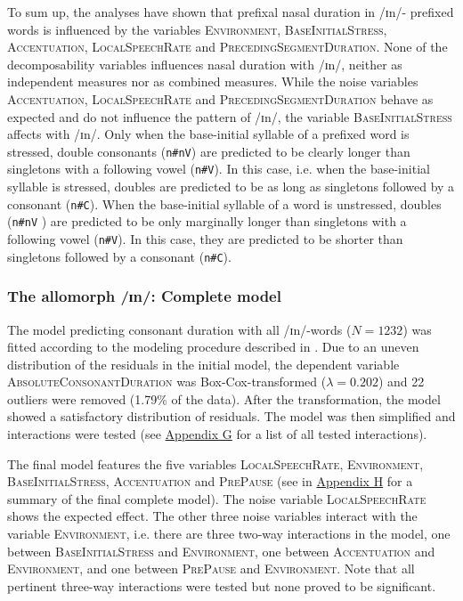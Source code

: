 To sum up, the analyses have shown that prefixal nasal duration in /ɪn/- prefixed words is influenced by the variables \textsc{Environment}, \textsc{BaseInitialStress}, \textsc{Accentuation}, \textsc{LocalSpeechRate} and \textsc{PrecedingSegmentDuration}. None of the decomposability variables influences nasal duration with /ɪn/, neither as independent measures nor as combined measures. 
While the noise variables \textsc{Accentuation}, \textsc{LocalSpeechRate} and \textsc{PrecedingSegmentDuration} behave as expected and do not influence the  pattern of /ɪn/, the variable \textsc{BaseInitialStress} affects  with /ɪn/. 
Only when the base-initial syllable of a prefixed word is stressed, double consonants (\texttt{n\#nV}) are predicted to be clearly longer than singletons with a following vowel (\texttt{n\#V}). In this case, i.e. when the base-initial syllable is stressed, doubles are predicted to be as long as singletons followed by a consonant (\texttt{n\#C}). When the base-initial syllable of a word is unstressed, doubles (\texttt{n\#nV} ) are predicted to be only marginally longer than singletons with a following vowel (\texttt{n\#V}). In this case, they are predicted to be shorter than singletons followed by a consonant (\texttt{n\#C}).

\subsubsection{The allomorph /ɪn/: Complete model}\largerpage
The model predicting consonant duration with all /ɪn/-words ($N=1232$) was fitted according to the modeling procedure described in . Due to an uneven distribution of the residuals in the initial model, the dependent variable \textsc{AbsoluteConsonantDuration} was Box-Cox-transformed ($\lambda = 0.202$) and 22 outliers were removed (1.79\% of the data). 
After the transformation, the model showed a satisfactory distribution of residuals. The model was then simplified and interactions were tested (see \hyperref[Appendix G Summaries of tested interactions in experimental study]{Appendix G} for a list of all tested interactions).

The final model features the five variables \textsc{LocalSpeechRate}, \textsc{Environment}, \textsc{BaseInitialStress}, \textsc{Accentuation} and \textsc{PrePause} (see  in \hyperref[Appendix H: Model Summaries Experiment]{Appendix H} for a summary of the final complete model). 
The noise variable \textsc{LocalSpeech\-Rate} shows the expected effect. The other three noise variables interact with the variable \textsc{Environment}, i.e. there are three two-way interactions in the model, one between \textsc{BaseInitialStress} and \textsc{Environment}, one between \textsc{Accentuation} and \textsc{Environment}, and one between \textsc{PrePause} and \textsc{Environment}.  Note that all pertinent three-way interactions were tested but none proved to be significant.


